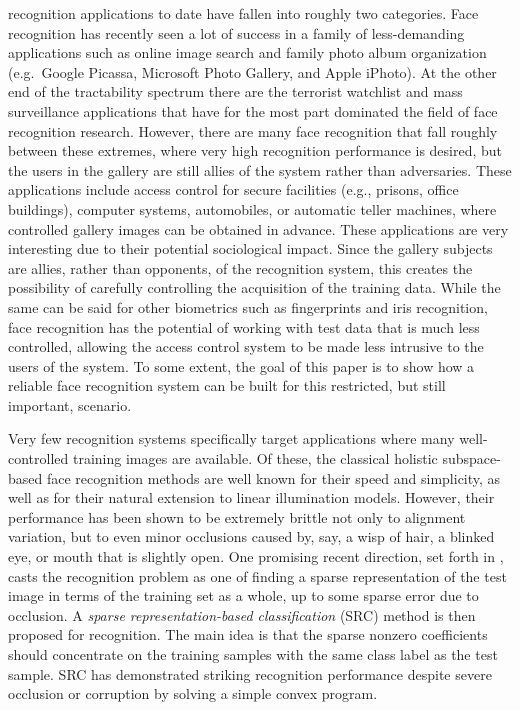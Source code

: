 \documentclass[12pt,journal,draftcls,letterpaper,onecolumn]{IEEEtran}
\begin{document}
 recognition applications to date have fallen into roughly two
categories.  Face recognition has recently seen a lot of success in a family of
less-demanding applications such as online image search and family photo album
organization (e.g.\ Google Picassa, Microsoft Photo Gallery, and Apple iPhoto).
At the other end of the tractability spectrum there are the terrorist watchlist
and mass surveillance applications that have for the most part dominated the
field of face recognition research.  However, there are many face recognition
that fall roughly between these extremes, where very high recognition
performance is desired, but the users in the gallery are still allies of the
system rather than adversaries.  These applications include access control for
secure facilities (e.g., prisons, office buildings), computer systems,
automobiles, or automatic teller machines, where controlled gallery images can
be obtained in advance.  These applications are very interesting due to their
potential sociological impact.  Since the gallery subjects are allies, rather
than opponents, of the recognition system, this creates the possibility of
carefully controlling the acquisition of the training data. While the same can
be said for other biometrics such as fingerprints and iris recognition, face
recognition has the potential of working with test data that is much less
controlled, allowing the access control system to be made less intrusive to the
users of the system. To some extent, the goal of this paper is to show how a
reliable face recognition system can be built for this restricted,
but still important, scenario. 

Very few recognition systems specifically target applications where many well-
controlled training images are available.  Of these, the classical holistic
subspace-based face recognition methods \cite{Turk1991-CVPR,Belhumeur1997-PAMI}
are well known for their speed and simplicity, as well as for their natural
extension to linear illumination models.  However, their performance has been
shown to be extremely brittle not only to alignment variation, but to even
minor occlusions caused by, say, a wisp of hair, a blinked eye, or mouth that
is slightly open. One promising recent direction, set forth in
\cite{Wright2009-PAMI}, casts the recognition problem as one of finding a
sparse representation of the test image in terms of the training set as a
whole, up to some sparse error due to occlusion. A \emph{sparse
representation-based classification} (SRC) method is then proposed for
recognition. The main idea is that the sparse nonzero coefficients should
concentrate on the training samples with the same class label as the test
sample. SRC has demonstrated striking recognition performance despite severe
occlusion or corruption by solving a simple convex program.  
\end{document}
